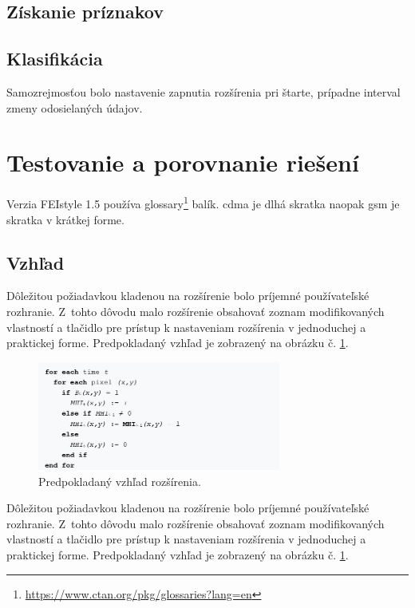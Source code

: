 \subsection{Získanie príznakov}

\subsection{Klasifikácia}
\noindent Samozrejmosťou bolo nastavenie zapnutia rozšírenia pri štarte, prípadne interval zmeny odosielaných údajov.

\section{Testovanie a porovnanie riešení}
\noindent Verzia FEIstyle 1.5 používa glossary\footnote{\url{https://www.ctan.org/pkg/glossaries?lang=en}} balík.
\acrfull{cdma} je dlhá skratka naopak \acrshort{gsm} je skratka v krátkej forme.


\subsection{Vzhľad}
\noindent Dôležitou požiadavkou kladenou na rozšírenie bolo príjemné používateľské rozhranie. Z~tohto dôvodu malo rozšírenie obsahovať zoznam modifikovaných vlastností a tlačidlo pre prístup k nastaveniam rozšírenia v jednoduchej a praktickej forme. Predpokladaný vzhľad je zobrazený na obrázku č. \ref{vzhladobr}.
\begin{figure}[!htbp]
  \centering
  \includegraphics[width=8cm]{img/MHIalg.jpg}
  \caption{Predpokladaný vzhľad rozšírenia.}
  \label{vzhladobr}
\end{figure}	 
\noindent Dôležitou požiadavkou kladenou na rozšírenie bolo príjemné používateľské rozhranie.\cite{t00} Z~tohto dôvodu malo rozšírenie obsahovať zoznam modifikovaných vlastností a tlačidlo pre prístup k nastaveniam rozšírenia v jednoduchej a praktickej forme. Predpokladaný vzhľad je zobrazený na obrázku č. \ref{vzhladobr}.

